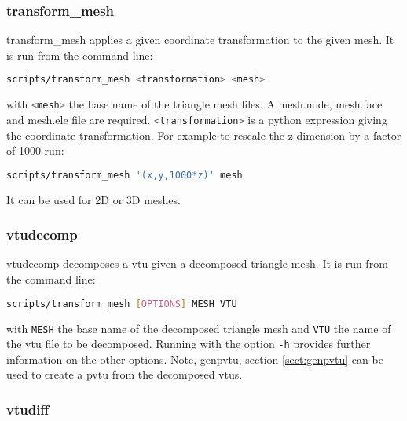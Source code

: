 \subsubsection{transform\_mesh}
\label{sect:transform_mesh}

transform\_mesh applies a given coordinate transformation to the given mesh. It is run from the command line:
\begin{lstlisting}[language = Bash]
scripts/transform_mesh <transformation> <mesh>
\end{lstlisting}
with \lstinline[language = Bash]+<mesh>+ the base name of the triangle mesh files. A mesh.node, mesh.face and mesh.ele file are required. \lstinline[language = Bash]+<transformation>+ is a python expression giving the coordinate transformation. For example to rescale the z-dimension by a factor of 1000 run:
\begin{lstlisting}[language = Bash]
scripts/transform_mesh '(x,y,1000*z)' mesh
\end{lstlisting}
It can be used for 2D or 3D meshes.


\subsubsection{vtudecomp}
\label{sect:vtudecomp}

vtudecomp decomposes a vtu given a decomposed triangle mesh. It is run from the command line:
\begin{lstlisting}[language = Bash]
scripts/transform_mesh [OPTIONS] MESH VTU
\end{lstlisting}
with \lstinline[language = Bash]+MESH+ the base name of the decomposed triangle mesh and \lstinline[language = Bash]+VTU+ the name of the vtu file to be decomposed. Running with the option \lstinline[language = Bash]+-h+ provides further information on the other options. Note, genpvtu, section \ref{sect:genpvtu} can be used to create a pvtu from the decomposed vtus.


\subsubsection{vtudiff}
\label{sect:vtudiff}

